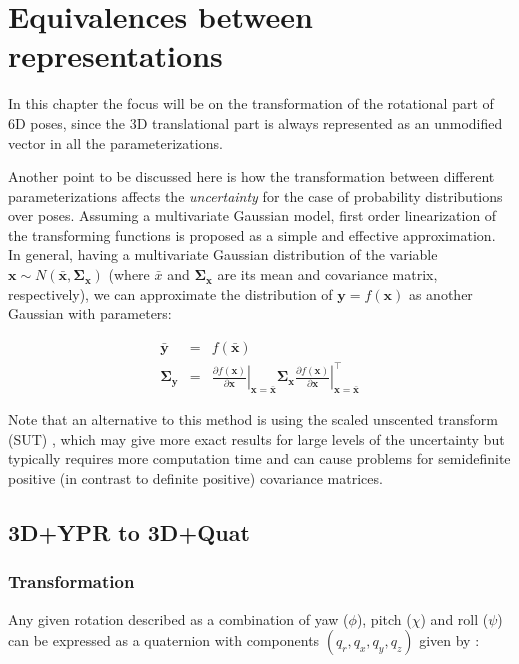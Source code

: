 \documentclass[a4paper,11pt]{report}
\begin{document}
\chapter{Equivalences between representations}

In this chapter the focus will be on the transformation of the rotational
part of 6D poses, since the 3D translational part is always represented as an
unmodified vector in all the parameterizations.

Another point to be discussed here is how the transformation between different
parameterizations affects the \emph{uncertainty} for the case of probability distributions over poses.
Assuming a multivariate Gaussian model, first order
linearization of the transforming functions
is proposed as a simple and effective approximation.
In general, having a multivariate Gaussian distribution of the variable
$\mathbf{x} \sim N(\bar{\mathbf{x}},\mathbf{\Sigma_x})$ (where $\bar{x}$ and $\mathbf{\Sigma_x}$
are its mean and covariance matrix, respectively), we can approximate
the distribution of $\mathbf{y} = f(\mathbf{x})$ as another Gaussian
with parameters:

\begin{eqnarray}
 \bar{\mathbf{y}} &=& f(\bar{\mathbf{x}}) \\
 \mathbf{\Sigma_y} &=&
\left.\frac{\partial f(\mathbf{x})}{\partial \mathbf{x}}\right|_{\mathbf{x}=\bar{\mathbf{x}}}
\mathbf{\Sigma_x}
\left.\frac{\partial f(\mathbf{x})}{\partial \mathbf{x}}\right|_{\mathbf{x}=\bar{\mathbf{x}}}^\top
\end{eqnarray}



Note that an alternative to this method is using the scaled unscented
transform (SUT) \cite{julier2002sut}, which may give more exact results for
large levels of the uncertainty but typically requires more computation time
and can cause problems for semidefinite positive (in contrast to definite positive)
covariance matrices.

\section{3D+YPR to 3D+Quat }
\label{sect:ypr2quat}

\subsection{Transformation}

Any given rotation described as a combination of yaw ($\phi$),
pitch ($\chi$) and roll ($\psi$) can
be expressed as a quaternion with components $(q_r, q_x,q_y,q_z)$
given by \cite{horn2001some}:
\end{document}
